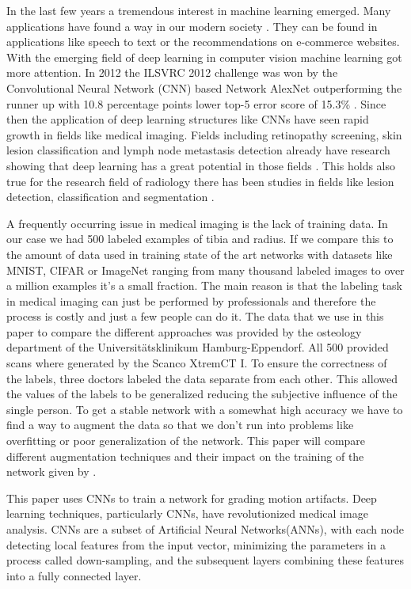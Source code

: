 \documentclass[
a4paper, 
12pt,
grayscalebody, %
abstract=on,
twoside, BCOR10mm, 12pt, DIV13,headinclude, footexclude, final, abstracton, openright
]{ibireprt}
\numberwithin{equation}{chapter}
\numberwithin{table}{chapter}
\numberwithin{figure}{chapter}
\numberwithin{algorithm}{chapter}
\numberwithin{example}{chapter}
\numberwithin{example}{chapter}
\begin{document}
In the last few years a tremendous interest in machine learning emerged. Many applications have found a way in our modern society \cite{LeCun2015}. They can be found in applications like speech to text or the recommendations on e-commerce websites.
With the emerging field of deep learning in computer vision machine learning got more attention. In 2012 the ILSVRC 2012 challenge  was won by the Convolutional Neural Network (CNN) based Network AlexNet outperforming the runner up with 10.8 percentage points lower top-5 error score of 15.3\% . Since then the application of deep learning structures like CNNs have seen rapid growth in fields like medical imaging. Fields including retinopathy screening, skin lesion classification and lymph node metastasis detection already have research showing that deep learning has a great potential in those fields . This holds also true for the research field of radiology there has been studies in fields like lesion detection, classification and segmentation \cite{Yamashita2018}.

A frequently occurring issue in medical imaging is the lack of training data. In our case we had 500 labeled examples of tibia and radius. If we compare this to the amount of data used in training state of the art networks with datasets like MNIST, CIFAR or ImageNet ranging from many thousand labeled images to over a million examples it's a small fraction. The main reason is that the labeling task in medical imaging can just be performed by professionals and therefore the process is costly and just a few people can do it.
The data that we use in this paper to compare the different approaches was provided by the osteology department of the Universitätsklinikum Hamburg-Eppendorf. All 500 provided scans where generated by the Scanco XtremCT I.
To ensure the correctness of the labels, three doctors labeled the data separate from each other. This allowed the values of the labels to be generalized reducing the subjective influence of the single person. To get a stable network with a somewhat high accuracy we have to find a way to augment the data so that we don't run into problems like overfitting or poor generalization of the network. This paper will compare different augmentation techniques and their impact on the training of the network given by \cite{Walle2023}. 

 
This paper uses CNNs to train a network for grading motion artifacts. Deep learning techniques, particularly CNNs, have revolutionized medical image analysis. CNNs are a subset of Artificial Neural Networks(ANNs), with each node detecting local features from the input vector, minimizing the parameters in a process called down-sampling, and the subsequent layers combining these features into a fully connected layer.%
\end{document}
